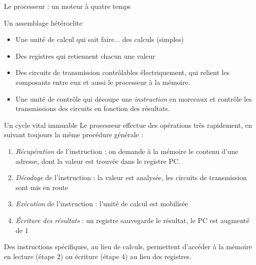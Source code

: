 \begin{frame}{Le processeur : un moteur à quatre temps}
  \begin{block}{Un assemblage hétéroclite}
    \begin{itemize}
    \item Une unité de calcul qui sait faire... des calculs (simples)
    \item Des registres qui retiennent chacun \textnormal{une} valeur
    \item Des circuits de transmission contrôlables électriquement, qui
      relient les composants entre eux et aussi le processeur à la
      mémoire.
    \item Une unité de contrôle qui découpe une \emph{instruction} en
      morceaux et contrôle les transmissions des circuits en fonction
      des résultats.
    \end{itemize}
  \end{block}
  \begin{block}{Un cycle vital immuable}
    Le processeur effectue des opérations très rapidement, en suivant toujours la même procédure générale :
    \begin{enumerate}
    \item \emph{Récupération} de l'instruction : on demande à la mémoire
      le contenu d'une adresse, dont la valeur est trouvée dans le
      registre PC.
    \item \emph{Décodage} de l'instruction : la valeur est analysée, les
      circuits de transmission sont mis en route
    \item \emph{Exécution} de l'instruction : l'unité de calcul est
      mobilisée
    \item \emph{Écriture des résultats} : un registre sauvegarde le
      résultat, le PC est augmenté de 1
    \end{enumerate}
    Des instructions spécifiques, au lieu de calculs, permettent d'accéder
    à la mémoire en lecture (étape 2) ou écriture (étape 4) au lieu des
    registres.
  \end{block}
\end{frame}
